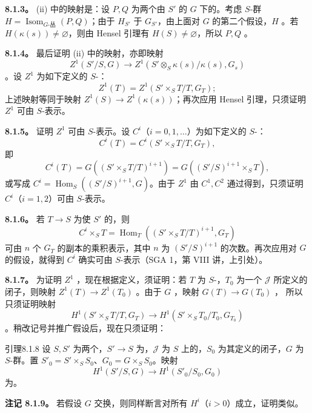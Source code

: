 \textbf{8.1.3。} (ii) 中的映射是：设 $P,Q$ 为两个由 $S'$ 的 $G$ 下的。考虑 $S$-群 $H=\operatorname{Isom}_{G\text{-丛}}(P,Q)$；由于 $H_{S'}$ 于 $G_{S'}$，由上面对 $G$ 的第二个假设，$H$ 。若 $H(\kappa(s))\ne\varnothing$，则由 Hensel 引理有 $H(S)\ne\varnothing$，所以 $P,Q$ 。

\textbf{8.1.4。} 最后证明 (ii) 中的映射，亦即映射
\[Z^1(S'/S,G)\longrightarrow Z^1(S'\otimes_S\kappa(s)/\kappa(s),G_s)\]
。设 $Z^1$ 为如下定义的 $S$-：
\[Z^1(T)=Z^1(S'\times_ST/T,G_T);\]
上述映射等同于映射 $Z^1(S)\to Z^1(\kappa(s))$；再次应用 Hensel 引理，只须证明 $Z^1$ 可由 $S$-表示。

\textbf{8.1.5。} 证明 $Z^1$ 可由 $S$-表示。设 $C^i$（$i=0,1,\ldots$）为如下定义的 $S$-：
\[C^i(T)=C^i(S'\times_ST/T,G_T),\]
即
\[C^i(T)=G((S'\times_ST/T)^{i+1})=G((S'/S)^{i+1}\times_ST),\]
或写成 $C^i=\operatorname{Hom}_S((S'/S)^{i+1},G)$。由于 $Z^1$ 由 $C^1,C^2$ 通过得到，只须证明 $C^i$（$i=1,2$）可由 $S$-表示。

\textbf{8.1.6。} 若 $T\to S$ 为使 $S'$ 的，则
\[C^i\times_ST=\operatorname{Hom}_T((S'\times_ST/T)^{i+1},G_T)\]
可由 $n$ 个 $G_T$ 的副本的乘积表示，其中 $n$ 为 $(S'/S)^{i+1}$ 的次数。再次应用对 $G$ 的假设，就得到 $C^i$ 确实可由 $S$-表示（SGA 1，第 VIII 讲，上引处）。

\textbf{8.1.7。} 为证明 $Z^1$ ，现在根据定义，须证明：若 $T$ 为 $S$-，$T_0$ 为一个 $\mathscr J$ 所定义的闭子，则映射 $Z^1(T)\to Z^1(T_0)$ 。由于 $G$ ，映射 $G(T)\to G(T_0)$ ，
所以只须证明映射
\[H^1(S'\times_ST/T,G_T)\longrightarrow H^1(S'\times_ST_0/T_0,G_{T_0})\]
。稍改记号并推广假设后，现在只须证明：
\begin{SGAresult}{引理}{8.1.8}
设 $S,S'$ 为两个，$S'\to S$ 为，$\mathscr J$ 为 $S$ 上的，$S_0$ 为其定义的闭子，$G$ 为 $S$-群。置 $S'_0=S'\times_SS_0$、$G_0=G\times_SS_0$。映射
\[H^1(S'/S,G)\longrightarrow H^1(S'_0/S_0,G_0)\]
为。
\end{SGAresult}
\textbf{注记 8.1.9。} 若假设 $G$ 交换，则同样断言对所有 $H^i$（$i>0$）成立，证明类似。

